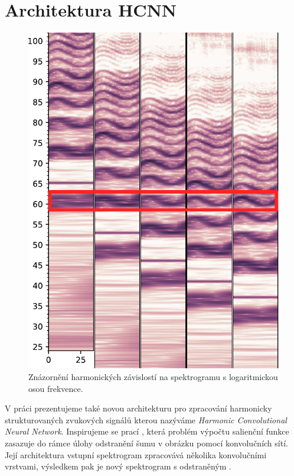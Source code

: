 \section{Architektura HCNN}

\begin{figure}[h]\centering
    \includegraphics[scale=0.5]{../img/spectrograms}
\caption{Znázornění harmonických závislostí na spektrogramu s logaritmickou osou frekvence.}\label{obr:hcqt}
\end{figure}

V práci prezentujeme také novou architekturu pro zpracování harmonicky strukturovaných zvukových signálů kterou nazýváme \emph{Harmonic Convolutional Neural Network}. Inspirujeme se prací \cite{Bittner2017}, která problém výpočtu salienční funkce zasazuje do rámce úlohy odstranění šumu v obrázku pomocí konvolučních sítí. Její architektura vstupní spektrogram zpracovává několika konvolučními vrstvami, výsledkem pak je nový spektrogram s odstraněným . 

